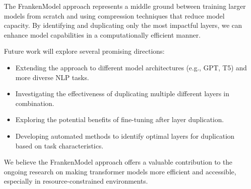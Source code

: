 \documentclass[conference]{IEEEtran}
\begin{document}
The FrankenModel approach represents a middle ground between training larger models from scratch and using compression techniques that reduce model capacity. By identifying and duplicating only the most impactful layers, we can enhance model capabilities in a computationally efficient manner.

Future work will explore several promising directions:

\begin{itemize}
    \item Extending the approach to different model architectures (e.g., GPT, T5) and more diverse NLP tasks.
    \item Investigating the effectiveness of duplicating multiple different layers in combination.
    \item Exploring the potential benefits of fine-tuning after layer duplication.
    \item Developing automated methods to identify optimal layers for duplication based on task characteristics.
\end{itemize}

We believe the FrankenModel approach offers a valuable contribution to the ongoing research on making transformer models more efficient and accessible, especially in resource-constrained environments.
\end{document}
